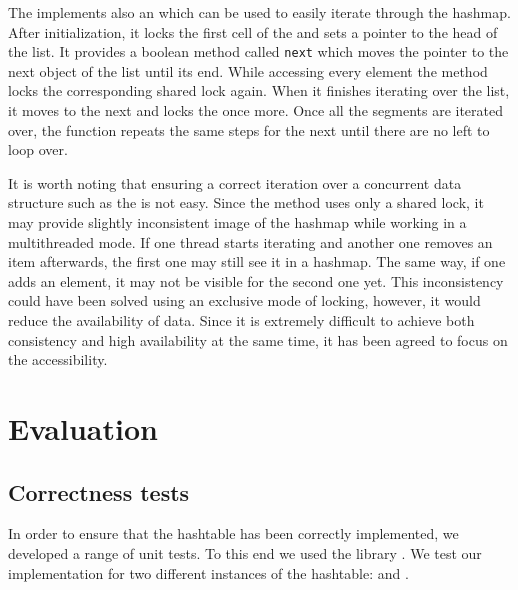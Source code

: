         The \NvmHashMap implements also an \Iterator which can be used to easily iterate through the hashmap.
        After initialization, it locks the first cell of the \internalHashMap and sets a pointer to the head of the list.
        It provides a boolean method called \texttt{next} which moves the pointer to the next object of the list until its end. 
        While accessing every element the method locks the corresponding shared lock again. 
        When it finishes iterating over the list, it moves to the next \Segment and locks the \internalHashMaps once more. 
        Once all the segments are iterated over, the function repeats the same steps for the next \internalHashMap until there are no left to loop over.
        
        It is worth noting that ensuring a correct iteration over a concurrent data structure such as the \NvmHashMap is not easy. 
        Since the \iterateMethod method uses only a shared lock, it may provide slightly inconsistent image of the hashmap while working in a multithreaded mode.
        If one thread starts iterating and another one removes an item afterwards, the first one may still see it in a hashmap. 
        The same way, if one adds an element, it may not be visible for the second one yet. 
        This inconsistency could have been solved using an exclusive mode of locking, however, it would reduce the availability of data. 
        Since it is extremely difficult to achieve both consistency and high availability at the same time, it has been agreed to focus on the accessibility.

\section{Evaluation}

\subsection{Correctness tests}
 
In order to ensure that the hashtable has been correctly implemented, we developed a range of unit tests. 
To this end we used the \GoogleTest library \cite{GoogleTest}. 
We test our implementation for two different instances of the hashtable: \integersMap and \stringsMap.
    
